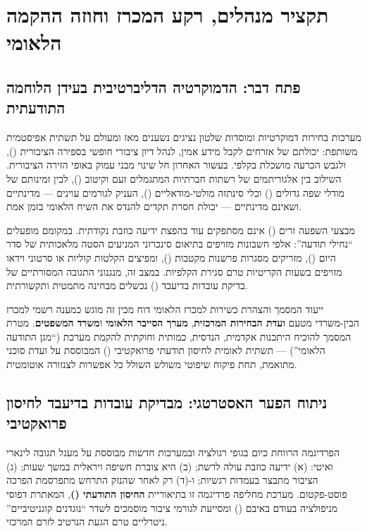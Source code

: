 \chapter{תקציר מנהלים, רקע המכרז וחוזה ההקמה הלאומי}
\label{ch:exec}

\section{פתח דבר: הדמוקרטיה הדליברטיבית בעידן הלוחמה התודעתית}
מערכות בחירות דמוקרטיות ומוסדות שלטון נציגים נשענים מאז ומעולם על תשתית אפיסטמית משותפת: יכולתם של אזרחים לקבל מידע אמין, לנהל דיון ציבורי חופשי בספירה הציבורית (), ולגבש הכרעה מושכלת בקלפי. בעשור האחרון חל שינוי מבני עמוק באופי הזירה הציבורית. השילוב בין אלגוריתמים של רשתות חברתיות המתגמלים זעם וקיטוב (), לבין זמינותם של מודלי שפה גדולים () וכלי סינתזה מולטי-מודאליים (), העניק לגורמים עוינים --- מדינתיים ושאינם מדינתיים --- יכולת חסרת תקדים להנדס את השיח הלאומי בזמן אמת.

מבצעי השפעה זרים () אינם מסתפקים עוד בהפצת ידיעה כוזבת נקודתית. במקומם מופעלים ``נחילי תודעה'': אלפי חשבונות מזויפים בתיאום סינכרוני המניעים הסטה מלאכותית של סדר היום (), מזריקים מסגרות פרשנות מקטבות (), ומפיצים הקלטות קוליות או סרטוני וידאו מזויפים בשעות הקריטיות טרם סגירת הקלפיות. במצב זה, מנגנוני התגובה המסורתיים של בדיקת עובדות בדיעבד () נכשלים מבחינה מתמטית ותקשורתית.

\begin{tenderbox}{ייעוד המסמך והצהרת כשירות למכרז הלאומי}
דוח מכין זה מוגש כמענה רשמי למכרז הבין-משרדי \textbf{} מטעם \textbf{ועדת הבחירות המרכזית}, \textbf{מערך הסייבר הלאומי} ו\textbf{משרד המשפטים}. מטרת המסמך להוכיח היתכנות אקדמית, הנדסית, כמותית וחוקתית להקמת מערכת \textbf{} (``מגן התודעה הלאומי'') --- תשתית לאומית לחיסון תודעתי פרואקטיבי () המבוססת על ועדת סוכני  מתואמת, תחת פיקוח שיפוטי משולש השולל כל אפשרות לצנזורה אוטומטית.
\end{tenderbox}

\section{ניתוח הפער האסטרטגי: מבדיקת עובדות בדיעבד לחיסון פרואקטיבי}
הפרדיגמה הרווחת כיום בגופי רגולציה ובמערכות חדשות מבוססת על מעגל תגובה לינארי ואיטי: (א) ידיעה כוזבת עולה לרשת; (ב) היא צוברת חשיפה ויראלית במשך שעות; (ג) הציבור מתבצר בעמדות רגשיות; ו-(ד) רק לאחר שהנזק התרחש מתפרסמת הפרכה פוסט-פקטום. מערכת  מחליפה פרדיגמה זו בתיאוריית \textbf{החיסון התודעתי ()}, המאתרת דפוסי מניפולציה בעודם באיבם () ומסייעת לגורמי ציבור מוסמכים לשדר ``נוגדנים קוגניטיביים'' ניטרליים טרם הגעת הנרטיב לזרם המרכזי.

